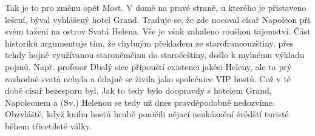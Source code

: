 
Tak je to pro změnu opět Most. V domě na pravé straně, u kterého je
přistaveno lešení, býval vyhlášený hotel Grand. Traduje se, že zde
nocoval císař Napoleon při svém tažení na ostrov Svatá Helena. Vše je
však zahaleno rouškou tajemství. Část historiků argumentuje tím, že
chybným překladem ze starofrancouzštiny, přes tehdy hojně využívanou
staroněmčinu do staročeštiny, došlo k mylnému výkladu pojmů. Např.
profesor Dbalý sice připouští existenci jakési Heleny, ale ta prý
rozhodně svatá nebyla a údajně se živila jako společnice VIP hostů.
Což v té době císař bezesporu byl. Jak to tedy bylo doopravdy s
hotelem Grand, Napoleonem a (Sv.) Helenou se tedy už dnes
pravděpodobně nedozvíme. Obzvláště, když knihu hostů hrubě poničili
nějací neukáznění švédští turisté během třicetileté války.

